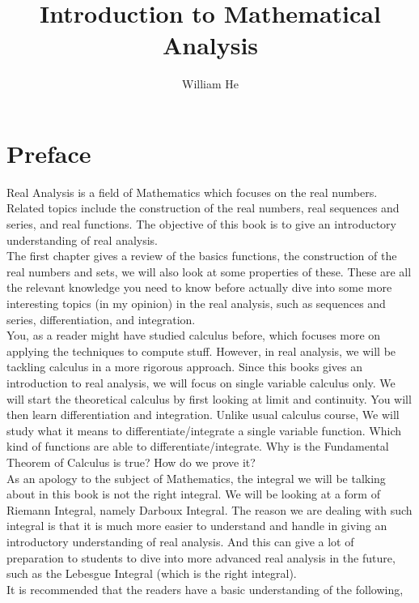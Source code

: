 \documentclass{book}
\title{\textbf{Introduction to Mathematical Analysis}}
\author{\Large William He}
\date{}
\begin{document}
\maketitle

\tableofcontents

\frontmatter

\chapter{Preface}
\begin{spacing}{1.5}
    \indent Real Analysis is a field of Mathematics which focuses on the real numbers. Related topics include the construction of the real numbers, real sequences and series, and real functions. The objective of this book is to give an introductory understanding of real analysis. \\
    \indent The first chapter gives a review of the basics functions, the construction of the real numbers and sets, we will also look at some properties of these. These are all the relevant knowledge you need to know before actually dive into some more interesting topics (in my opinion) in the real analysis, such as sequences and series, differentiation, and integration. \\
    \indent You, as a reader might have studied calculus before, which focuses more on applying the techniques to compute stuff. However, in real analysis, we will be tackling calculus in a more rigorous approach. Since this books gives an introduction to real analysis, we will focus on single variable calculus only. We will start the theoretical calculus by first looking at limit and continuity. You will then learn differentiation and integration. Unlike usual calculus course, We will study what it means to differentiate/integrate a single variable function. Which kind of functions are able to differentiate/integrate. Why is the Fundamental Theorem of Calculus is true? How do we prove it? \\
    \indent As an apology to the subject of Mathematics, the integral we will be talking about in this book is not the right integral. We will be looking at a form of Riemann Integral, namely Darboux Integral. The reason we are dealing with such integral is that it is much more easier to understand and handle in giving an introductory understanding of real analysis. And this can give a lot of preparation to students to dive into more advanced real analysis in the future, such as the Lebesgue Integral (which is the right integral).\\
    \indent It is recommended that the readers have a basic understanding of the following,
\end{spacing}
\end{document}
